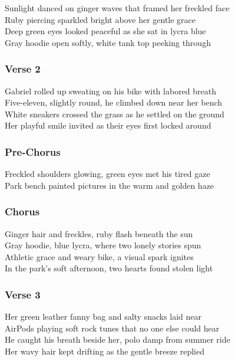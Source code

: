 Sunlight danced on ginger waves that framed her freckled face\\
Ruby piercing sparkled bright above her gentle grace\\
Deep green eyes looked peaceful as she sat in lycra blue\\
Gray hoodie open softly, white tank top peeking through

\subsubsection{Verse 2}\label{verse-2-29}

Gabriel rolled up sweating on his bike with labored breath\\
Five-eleven, slightly round, he climbed down near her bench\\
White sneakers crossed the grass as he settled on the ground\\
Her playful smile invited as their eyes first locked around

\subsubsection{Pre-Chorus}\label{pre-chorus-52}

Freckled shoulders glowing, green eyes met his tired gaze\\
Park bench painted pictures in the warm and golden haze

\subsubsection{Chorus}\label{chorus-75}

Ginger hair and freckles, ruby flash beneath the sun\\
Gray hoodie, blue lycra, where two lonely stories spun\\
Athletic grace and weary bike, a visual spark ignites\\
In the park's soft afternoon, two hearts found stolen light

\subsubsection{Verse 3}\label{verse-3-15}

Her green leather fanny bag and salty snacks laid near\\
AirPods playing soft rock tunes that no one else could hear\\
He caught his breath beside her, polo damp from summer ride\\
Her wavy hair kept drifting as the gentle breeze replied

